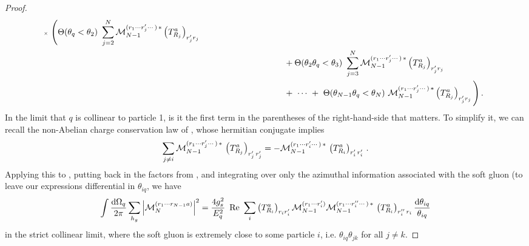 \begin{proof}
\begin{align}
        \,\,\,
        {\scriptscriptstyle\times}
        \,\,
        \Bigg(
            \Theta(\theta_q < \theta_2)
            \,\,
            \sum_{j=2}^N
            \mathcal{M}_{N-1}^{(r_1\cdots r'_j \cdots )\,*}
            \left(T^a_{R_j}\right)_{r'_j r_j}
            \\
            & \notag
            \qquad\qquad\qquad\qquad\qquad
            +
            \Theta(\theta_2 \theta_q < \theta_3)
            \,\,
            \sum_{j=3}^N
            \mathcal{M}_{N-1}^{(r_1\cdots r'_j \cdots )\,*}
            \left(T^a_{R_j}\right)_{r'_j r_j}
            \\
            & \notag
            \qquad\qquad\qquad\qquad\qquad
            +
            \,\,\cdots\,\,+\,\,
            \Theta(\theta_{N-1} \theta_q < \theta_N)
            \,\,
            \mathcal{M}_{N-1}^{(r_1\cdots r'_j \cdots )\,*}
            \left(T^a_{R_j}\right)_{r'_j r_j}
        \Bigg)
        \,.
    \end{align}
    In the limit that \(q\) is collinear to particle 1, is it the first term in the parentheses of the right-hand-side that matters.
    To simplify it, we can recall the non-Abelian charge conservation law of , whose hermitian conjugate implies
    \begin{align}
        \sum_{j \neq i}
        \mathcal{M}_{N-1}
        ^{(r_1\cdots r'_j\cdots )\, *}
        \,
        \le(T^a_{R_j}\ri)\indices{_{r'_j\,r'_j}}
        =
        -
        \mathcal{M}_{N-1}
        ^{(r_1\cdots r'_i\cdots )\, *}
        \,
        \le(T^a_{R_i}\ri)\indices{_{r'_i\,r'_i}}
        \,.
    \end{align}
    Applying this to , putting back in the factors from , and integrating over only the azimuthal information associated with the soft gluon (to leave our expressions differential in \(\theta_{iq}\), we have
    \begin{align}
        \int \frac{\dd\Omega_q}{2\pi}
        \sum_{h_g}
        \abs{\mathcal{M}_N^{(r_1\cdots r_{N-1}a)}}^2
        =
        \frac{4 g_s^2}{E_q^2}
        \,\,
        \Re
        \,\,
        \sum_i
        \le(T^a_{R_i}\ri)_{r_i r'_i}
        \mathcal{M}_{N-1}^{(r_1\cdots r'_i)}
        \mathcal{M}_{N-1}^{(r_1\cdots r''_i\cdots )\, *}
        \,
        \le(T^a_{R_i}\ri)\indices{_{r''_i\,r_i}}
        \frac{\dd\theta_{iq}}{\theta_{iq}}
    \end{align}
    in the strict collinear limit, where the soft gluon is extremely close to some particle \(i\), i.e. \(\theta_{iq} \theta_{jk}\) for all \(j \neq k\).



\end{proof}
